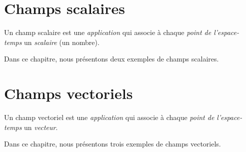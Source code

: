 \chapter{Champs scalaires}
%
Un champ scalaire est une {\it application} qui associe à chaque {\it point de l'espace-temps} un {\it scalaire} (un nombre).

Dans ce chapitre, nous présentons deux exemples de champs scalaires.


%

%
\chapter{Champs vectoriels}
%
Un champ vectoriel est une {\it application} qui associe à chaque {\it point de l'espace-temps} un {\it vecteur}.


Dans ce chapitre, nous présentons trois exemples de champs vectoriels.


%

%

%

